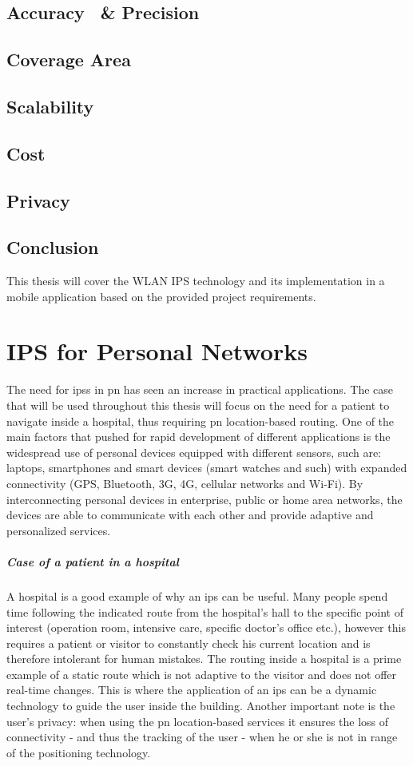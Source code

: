 \subsection{Accuracy ~\& Precision}
\subsection{Coverage Area}
\subsection{Scalability}
\subsection{Cost}
\subsection{Privacy}
\subsection{Conclusion}
This thesis will cover the WLAN IPS technology and its implementation in a mobile application based on the provided project requirements.
\section{IPS for Personal Networks}
The need for \acrshort{ips}s in \acrfull{pn} has seen an increase in practical applications. The case that will be used throughout this thesis will focus on the need for a patient to navigate inside a hospital, thus requiring \acrshort{pn} location-based routing. One of the main factors that pushed for rapid development of different applications is the widespread use of personal devices equipped with different sensors, such are: laptops, smartphones and smart devices (smart watches and such) with expanded connectivity (GPS, Bluetooth, 3G, 4G, cellular networks and Wi-Fi). By interconnecting personal devices in enterprise, public or home area networks, the devices are able to communicate with each other and provide adaptive and personalized services.
\subparagraph{Case of a patient in a hospital}
A hospital is a good example of why an \acrshort{ips} can be useful. Many people spend time following the indicated route from the hospital's hall to the specific point of interest (operation room, intensive care, specific doctor's office etc.), however this requires a patient or visitor to constantly check his current location and is therefore intolerant for human mistakes. The routing inside a hospital is a prime example of a static route which is not adaptive to the visitor and does not offer real-time changes. This is where the application of an \acrshort{ips} can be a dynamic technology to guide the user inside the building. Another important note is the user's privacy: when using the \acrshort{pn} location-based services it ensures the loss of connectivity - and thus the tracking of the user - when he or she is not in range of the positioning technology.
